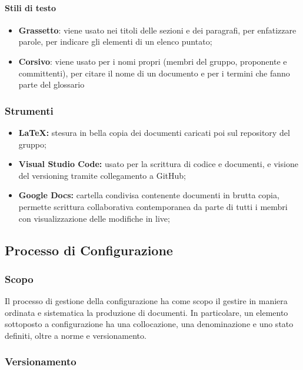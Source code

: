 		\paragraph*{Stili di testo} %
			\begin{itemize}
				\item \textbf{Grassetto}: viene usato nei titoli delle sezioni e dei paragrafi, per enfatizzare parole, per indicare gli elementi di un elenco puntato;
				\item \textbf{Corsivo}: viene usato per i nomi propri (membri del gruppo,  proponente e committenti), per citare il nome di un documento e per i termini che fanno parte del glossario
			\end{itemize}
	
		
		\subsubsection{Strumenti}
			\begin{itemize}
				\item \textbf{LaTeX:} stesura in bella copia dei documenti caricati poi sul repository del gruppo;
				\item \textbf{Visual Studio Code:} usato per la scrittura di codice e documenti, e visione del versioning tramite collegamento a GitHub;
				\item \textbf{Google Docs:} cartella condivisa contenente documenti in brutta copia, permette scrittura collaborativa contemporanea da parte di tutti i membri con visualizzazione delle modifiche in live;
			\end{itemize}
		
	\subsection{Processo di Configurazione}
	\subsubsection{Scopo}
		Il processo di gestione della configurazione ha come scopo il gestire in maniera ordinata e sistematica la produzione di documenti. %
		 In particolare, un elemento sottoposto a configurazione ha una collocazione, una denominazione e uno stato definiti, oltre a norme e versionamento. 
 	
	\subsubsection{Versionamento}
